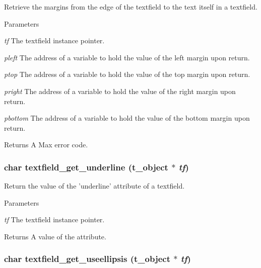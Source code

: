 Retrieve the margins from the edge of the textfield to the text itself in a textfield. 
\begin{DoxyParams}{Parameters}
\item[{\em tf}]The textfield instance pointer. \item[{\em pleft}]The address of a variable to hold the value of the left margin upon return. \item[{\em ptop}]The address of a variable to hold the value of the top margin upon return. \item[{\em pright}]The address of a variable to hold the value of the right margin upon return. \item[{\em pbottom}]The address of a variable to hold the value of the bottom margin upon return. \end{DoxyParams}
\begin{DoxyReturn}{Returns}
A Max error code. 
\end{DoxyReturn}
\hypertarget{group__textfield_gadc8b41ef216b8c539456c0298ca179cd}{
\subsubsection[{textfield\_\-get\_\-underline}]{\setlength{\rightskip}{0pt plus 5cm}char textfield\_\-get\_\-underline ({\bf t\_\-object} $\ast$ {\em tf})}}
\label{group__textfield_gadc8b41ef216b8c539456c0298ca179cd}


Return the value of the 'underline' attribute of a textfield. 
\begin{DoxyParams}{Parameters}
\item[{\em tf}]The textfield instance pointer. \end{DoxyParams}
\begin{DoxyReturn}{Returns}
A value of the attribute. 
\end{DoxyReturn}
\hypertarget{group__textfield_gaecee9184f75ab309ac993e4fb9d233d0}{
\subsubsection[{textfield\_\-get\_\-useellipsis}]{\setlength{\rightskip}{0pt plus 5cm}char textfield\_\-get\_\-useellipsis ({\bf t\_\-object} $\ast$ {\em tf})}}
\label{group__textfield_gaecee9184f75ab309ac993e4fb9d233d0}


